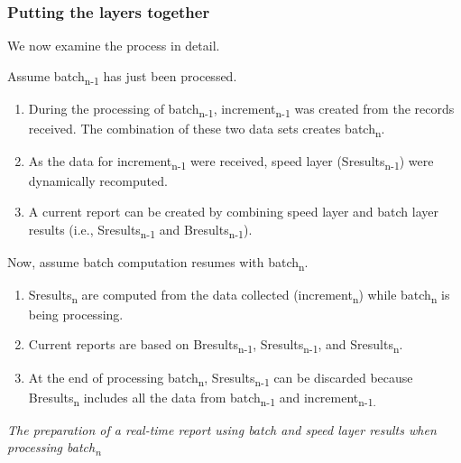 \documentclass[
]{article}
\begin{document}
\hypertarget{putting-the-layers-together}{%
\subsubsection*{Putting the layers together}\label{putting-the-layers-together}}

We now examine the process in detail.

Assume batch\textsubscript{n-1} has just been processed.

\begin{enumerate}
\def\labelenumi{\arabic{enumi}.}
\item
  During the processing of batch\textsubscript{n-1}, increment\textsubscript{n-1} was created from
  the records received. The combination of these two data sets creates
  batch\textsubscript{n}.
\item
  As the data for increment\textsubscript{n-1} were received, speed layer
  (Sresults\textsubscript{n-1}) were dynamically recomputed.
\item
  A current report can be created by combining speed layer and batch
  layer results (i.e., Sresults\textsubscript{n-1} and Bresults\textsubscript{n-1}).
\end{enumerate}

Now, assume batch computation resumes with batch\textsubscript{n}.

\begin{enumerate}
\def\labelenumi{\arabic{enumi}.}
\item
  Sresults\textsubscript{n} are computed from the data collected (increment\textsubscript{n})
  while batch\textsubscript{n} is being processing.
\item
  Current reports are based on Bresults\textsubscript{n-1}, Sresults\textsubscript{n-1}, and
  Sresults\textsubscript{n}.
\item
  At the end of processing batch\textsubscript{n}, Sresults\textsubscript{n-1} can be discarded
  because Bresults\textsubscript{n} includes all the data from batch\textsubscript{n-1} and
  increment\textsubscript{n-1.}
\end{enumerate}

\emph{The preparation of a real-time report using batch and speed layer
results when processing batch\textsubscript{n}}
\end{document}
